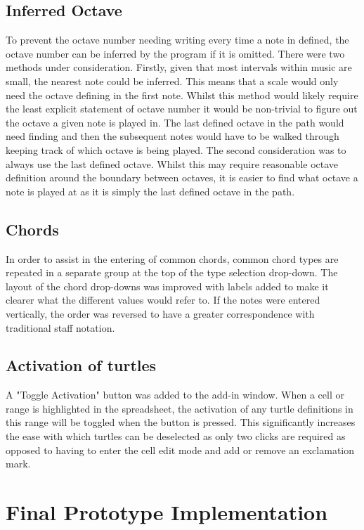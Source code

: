 \subsection{Inferred Octave}

To prevent the octave number needing writing every time a note in defined, the octave number can be inferred by the program if it is omitted. There were two methods under consideration. Firstly, given that most intervals within music are small, the nearest note could be inferred. This means that a scale would only need the octave defining in the first note. Whilst this method would likely require the least explicit statement of octave number it would be non-trivial to figure out the octave a given note is played in. The last defined octave in the path would need finding and then the subsequent notes would have to be walked through keeping track of which octave is being played. The second consideration was to always use the last defined octave. Whilst this may require reasonable octave definition around the boundary between octaves, it is easier to find what octave a note is played at as it is simply the last defined octave in the path.

\subsection{Chords}

In order to assist in the entering of common chords, common chord types are repeated in a separate group  at the top of the type selection drop-down. The layout of the chord drop-downs was improved with labels added to make it clearer what the different values would refer to. If the notes were entered vertically, the order was reversed to have a greater correspondence with traditional staff notation.

\subsection{Activation of turtles}

A "Toggle Activation" button was added to the add-in window. When a cell or range is highlighted in the spreadsheet, the activation of any turtle definitions in this range will be toggled when the button is pressed.  This significantly increases the ease with which turtles can be deselected as only two clicks are required as opposed to having to enter the cell edit mode and add or remove an exclamation mark.

\section{Final Prototype Implementation}

